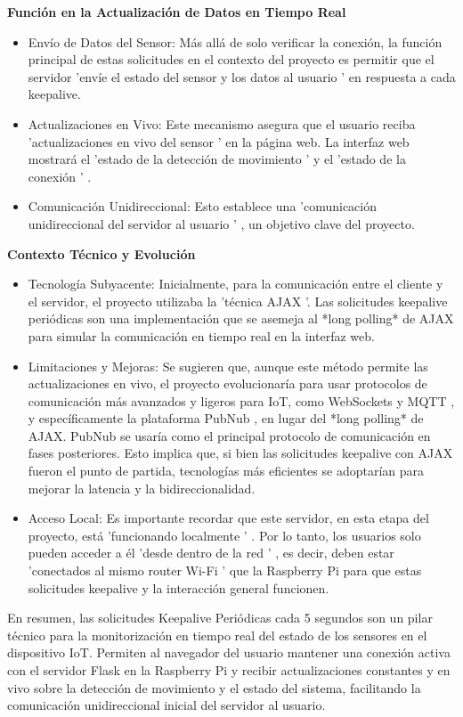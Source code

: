 \documentclass{report}
\begin{document}
\textbf{Función en la Actualización de Datos en Tiempo Real}
\begin{itemize}
    \item Envío de Datos del Sensor:  Más allá de solo verificar la conexión, la función principal de estas solicitudes en el contexto del proyecto es 
    permitir que el servidor   'envíe el estado del sensor y los datos al usuario '  en respuesta a cada keepalive.
    \item Actualizaciones en Vivo:  Este mecanismo asegura que el usuario reciba   'actualizaciones en vivo del sensor '  en la página web. La interfaz 
    web mostrará el   'estado de la detección de movimiento '  y el   'estado de la conexión ' .
    \item Comunicación Unidireccional:  Esto establece una   'comunicación unidireccional del servidor al usuario ' , un objetivo clave del proyecto.
\end{itemize}

\textbf{Contexto Técnico y Evolución}
\begin{itemize}
    \item Tecnología Subyacente:  Inicialmente, para la comunicación entre el cliente y el servidor, el proyecto utilizaba la   'técnica AJAX '. 
    Las solicitudes keepalive periódicas son una implementación que se asemeja al *long polling* de AJAX para simular la comunicación en tiempo real 
    en la interfaz web.
    \item Limitaciones y Mejoras:  Se  sugieren que, aunque este método permite las actualizaciones en vivo, el proyecto evolucionaría para usar 
    protocolos de comunicación más avanzados  y ligeros para IoT, como  WebSockets y MQTT , y específicamente la plataforma  PubNub , en lugar del 
    *long polling* de AJAX. PubNub se usaría como el principal protocolo de comunicación en fases posteriores. Esto implica que, si bien las solicitudes 
    keepalive con AJAX fueron el punto de partida, tecnologías más eficientes se adoptarían para mejorar la latencia y la bidireccionalidad.
    \item Acceso Local:  Es importante recordar que este servidor, en esta etapa del proyecto, está   'funcionando localmente ' . Por lo tanto, los 
    usuarios solo pueden acceder a él   'desde dentro de la red ' , es decir, deben estar   'conectados al mismo router Wi-Fi '  que la Raspberry Pi 
    para que estas solicitudes keepalive y la interacción general funcionen.
\end{itemize}
En resumen, las  solicitudes Keepalive Periódicas cada 5 segundos  son un pilar técnico para la  monitorización en tiempo real del estado de los sensores  
en el dispositivo IoT. Permiten al navegador del usuario mantener una  conexión activa  con el servidor Flask en la Raspberry Pi y recibir  actualizaciones 
constantes y en vivo  sobre la detección de movimiento y el estado del sistema, facilitando la comunicación unidireccional inicial del servidor al usuario.
\end{document}
